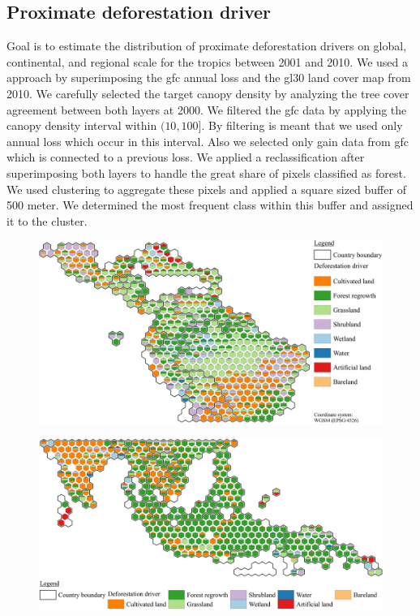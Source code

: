 		\subsection{Proximate deforestation driver}
		\label{subsec:results_proxy_deforestation_driver}
			 Goal is to estimate the distribution of proximate deforestation drivers on global, continental, and regional scale for the tropics between 2001 and 2010. We used a approach by superimposing the gfc annual loss and the gl30 land cover map from 2010. We carefully selected the target canopy density by analyzing the tree cover agreement between both layers at 2000. We filtered the gfc data by applying the canopy density interval within $(10,100]$. By filtering is meant that we used only annual loss which occur in this interval. Also we selected only gain data from gfc which is connected to a previous loss. We applied a reclassification after superimposing both layers to handle the great share of pixels classified as forest. We used clustering to aggregate these pixels and applied a square sized buffer of 500 meter. We determined the most frequent class within this buffer and assigned it to the cluster.


			\begin{figure}[ht]
				\centering
				\includegraphics[scale=1]{img/americas_driver_frameless}
				\caption[Map of proximate deforestation driver in South America]{}
				\label{fig:americas_driver}
			\end{figure}


			\begin{figure}[ht]
				\centering
				\includegraphics[scale=1]{img/asia_driver_frameless}
				\caption[Map of proximate deforestation driver in Asia/Australia]{}
				\label{fig:asia_driver}
			\end{figure}


